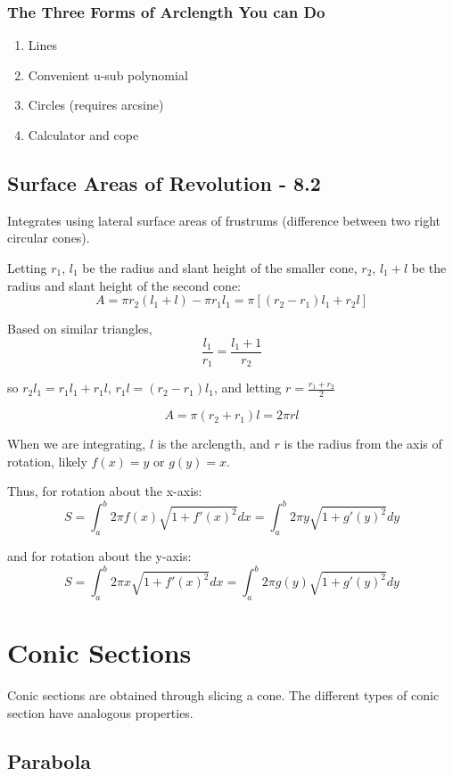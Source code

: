\documentclass{article}
\begin{document}
\subsubsection{The Three Forms of Arclength You can Do}
\begin{enumerate}
    \item Lines
    \item Convenient u-sub polynomial
    \item Circles (requires arcsine)
    \item Calculator and cope
\end{enumerate}

\subsection{Surface Areas of Revolution - 8.2}
Integrates using lateral surface areas of frustrums (difference between two right circular cones).

Letting $r_1$, $l_1$ be the radius and slant height of the smaller cone, $r_2$, $l_1 + l$ be the radius and slant height of the second cone:
$$A = \pi r_2(l_1 + l) - \pi r_1 l_1 = \pi[(r_2 - r_1)l_1 + r_2l]$$

Based on similar triangles,
$$\frac{l_1}{r_1} = \frac{l_1 + 1}{r_2}$$

so $r_2 l_1 = r_1 l_1 + r_1 l$, $r_1 l = (r_2 - r_1)l_1$, and letting $r = \frac{r_1 + r_2}{2}$

$$A = \pi (r_2 + r_1)l = 2 \pi r l$$

When we are integrating, $l$ is the arclength, and $r$ is the radius from the axis of rotation, likely $f(x) = y$ or $g(y) = x$.

Thus, for rotation about the x-axis:
$$S = \int_{a}^{b} 2 \pi f(x) \sqrt{1 + f'(x)^2} dx = \int_{a}^{b} 2 \pi y \sqrt{1 + g'(y)^2} dy$$

and for rotation about the y-axis:
$$S = \int_{a}^{b} 2 \pi x \sqrt{1 + f'(x)^2} dx = \int_{a}^{b} 2 \pi g(y) \sqrt{1 + g'(y)^2} dy$$


\section{Conic Sections}
Conic sections are obtained through slicing a cone. The different types of conic section have analogous properties.

\subsection{Parabola}
\end{document}
